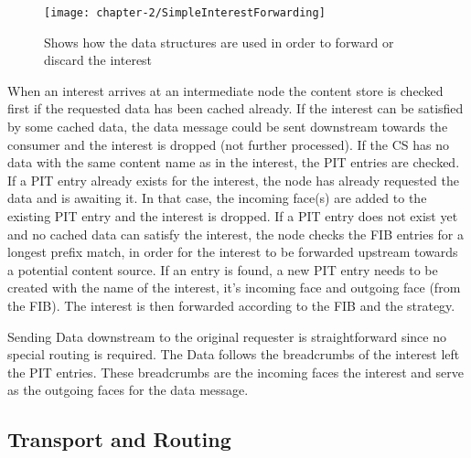 \vspace{5mm} %

\begin{figure}[H]
  \centering
  \texttt{[image: chapter-2/SimpleInterestForwarding]}
  \caption{Shows how the data structures are used in order to forward or discard the interest}
  \label{fig:SimpleInterestForwarding}
\end{figure}

\vspace{5mm} %

When an interest arrives at an intermediate node the content store is checked first if the requested data has been cached already. If the interest can be satisfied by some cached data, the data message could be sent downstream towards the consumer and the interest is dropped (not further processed). If the CS has no data with the same content name as in the interest, the PIT entries are checked. If a PIT entry already exists for the interest, the node has already requested the data and is awaiting it. In that case, the incoming face(s) are added to the existing PIT entry and the interest is dropped. If a PIT entry does not exist yet and no cached data can satisfy the interest, the node checks the FIB entries for a longest prefix match, in order for the interest to be forwarded upstream towards a potential content source. If an entry is found, a new PIT entry needs to be created with the name of the interest, it's incoming face and outgoing face (from the FIB). The interest is then forwarded according to the FIB and the strategy.

\vspace{5mm} %

Sending Data downstream to the original requester is straightforward since no special routing is required. The Data follows the breadcrumbs of the interest left the PIT entries. These breadcrumbs are the incoming faces the interest and serve as the outgoing faces for the data message.

\subsection{Transport and Routing}

